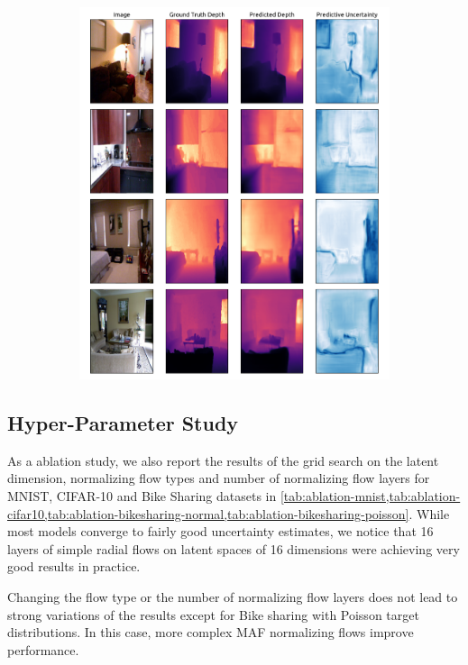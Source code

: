 \begin{figure}[ht!]
\begin{subfigure}[t]{.5\textwidth}
        \includegraphics[width=1\textwidth]{sections/007_iclr2022/resources/appendix/nyu-84-new-ii.pdf}
    \end{subfigure}%
\end{figure}


\subsection{Hyper-Parameter Study}
\label{sec:ablation-study_007}

As a ablation study, we also report the results of the grid search on the latent dimension, normalizing flow types and number of normalizing flow layers for MNIST, CIFAR-10 and Bike Sharing datasets in \cref{tab:ablation-mnist,tab:ablation-cifar10,tab:ablation-bikesharing-normal,tab:ablation-bikesharing-poisson}. While most models converge to fairly good uncertainty estimates, we notice that 16 layers of simple radial flows on latent spaces of 16 dimensions were achieving very good results in practice. 

Changing the flow type or the number of normalizing flow layers does not lead to strong variations of the results except for Bike sharing with Poisson target distributions. In this case, more complex MAF normalizing flows improve \NatPNacro{} performance. 

